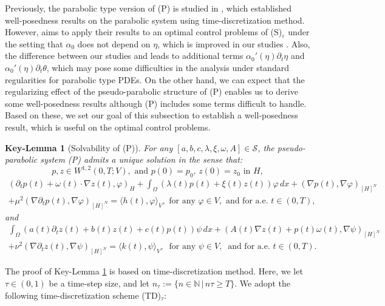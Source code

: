 \documentclass{sinst}
\numberwithin{equation}{section}
\theoremstyle{plain}
\newtheorem{keylem}{Key-Lemma}
\theoremstyle{definition}
\def\N{\mathbb{N}}
\def\sS{\mathscr{S}}
\begin{document}
Previously, the parabolic type version of (P) is studied in \cite{MR3888633}, which established well-posedness results on the parabolic system using time-discretization method. However, \cite{MR3888633} aims to apply their results to an optimal control problems of (S)$_\varepsilon$ under the setting that $\alpha_0$ does not depend on $\eta$, which is improved in our studies \cite{MR4797677,mizuno2024weak}. Also, the difference between our studies and \cite{MR3888633} leads to additional terms $\alpha_0'(\eta) \partial_t \eta$ and $\alpha_0'(\eta) \partial_t \theta$, which may pose some difficulties in the analysis under standard regularities for parabolic type PDEs. On the other hand, we can expect that the regularizing effect of the pseudo-parabolic structure of (P) enables us to derive some well-posedness results although (P) includes some terms difficult to handle. Based on these, we set our goal of this subsection to establish a well-posedness result, which is useful on the optimal control problems.

\begin{keylem}[Solvability of (P)] \label{lem:Psol}
  For any $[a,b,c,\lambda,\xi,\omega,A] \in \sS$, the pseudo-parabolic system (P) admits a unique solution in the sense that:
  \begin{equation}
    p,z \in W^{1,2}(0,T;V), \mbox{ and } p(0) = p_0, \, z(0) = z_0 \mbox{ in } H,
  \end{equation}
  \begin{gather}
    (\partial_t p(t) + \omega(t) \cdot \nabla z(t), \varphi)_H + \int_\Omega (\lambda(t) p(t) + \xi(t)z(t)) \varphi \,dx +(\nabla p(t), \nabla \varphi)_{[H]^N} \label{P_var1}
    \\
    + \mu^2 (\nabla \partial_t p(t), \nabla \varphi)_{[H]^N} = \langle h(t),\varphi \rangle_V, \mbox{ for any } \varphi \in V, \mbox{ and for a.e. } t \in (0,T),
  \end{gather}
  and
  \begin{gather}
    \int_\Omega (a(t) \partial_t z(t) + b(t) z(t) + c(t) p(t)) \psi \,dx + (A(t) \nabla z(t) + p(t)\omega(t), \nabla \psi)_{[H]^N} \label{P_var2}
    \\
    + \nu^2(\nabla \partial_t z(t), \nabla \psi)_{[H]^N} = \langle k(t),\psi \rangle_V, \ \mbox{ for any }  \psi \in V, \ \mbox{ and for a.e. } t \in (0,T).
  \end{gather}
\end{keylem}

The proof of Key-Lemma \ref{lem:Psol} is based on time-discretization method. Here, we let $\tau \in (0,1)$ be a time-step size, and let $n_\tau := \{n \in \N \,|\, n \tau \geq T \}$. We adopt the following time-discretization scheme (TD)$_\tau$:
\end{document}
